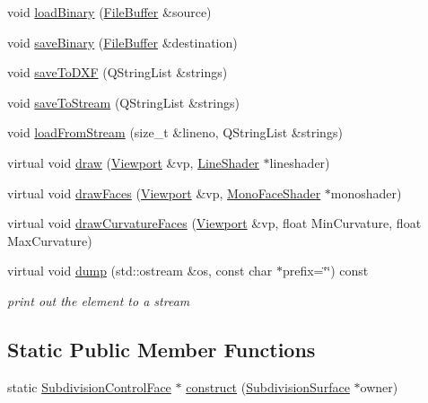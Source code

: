 \begin{DoxyCompactItemize}
\item 
void \hyperlink{classShipCAD_1_1SubdivisionControlFace_aa5ba43707787cde6e99cd645708e9200}{load\-Binary} (\hyperlink{classShipCAD_1_1FileBuffer}{File\-Buffer} \&source)
\item 
void \hyperlink{classShipCAD_1_1SubdivisionControlFace_a562b877e868dbd86ffe2c864232e1b78}{save\-Binary} (\hyperlink{classShipCAD_1_1FileBuffer}{File\-Buffer} \&destination)
\item 
void \hyperlink{classShipCAD_1_1SubdivisionControlFace_aecc7636c397ca5669cf7ddb995feac03}{save\-To\-D\-X\-F} (Q\-String\-List \&strings)
\item 
void \hyperlink{classShipCAD_1_1SubdivisionControlFace_a8a618958b27b97dd6da2473e130d7a8e}{save\-To\-Stream} (Q\-String\-List \&strings)
\item 
void \hyperlink{classShipCAD_1_1SubdivisionControlFace_ae06e29e54f93c529875bbd66b32ad3e7}{load\-From\-Stream} (size\-\_\-t \&lineno, Q\-String\-List \&strings)
\item 
virtual void \hyperlink{classShipCAD_1_1SubdivisionControlFace_ac253493bccd91108d936b651e72b46f8}{draw} (\hyperlink{classShipCAD_1_1Viewport}{Viewport} \&vp, \hyperlink{classShipCAD_1_1LineShader}{Line\-Shader} $\ast$lineshader)
\item 
virtual void \hyperlink{classShipCAD_1_1SubdivisionControlFace_aef1327fd3e623b190d67dcb461a3e950}{draw\-Faces} (\hyperlink{classShipCAD_1_1Viewport}{Viewport} \&vp, \hyperlink{classShipCAD_1_1MonoFaceShader}{Mono\-Face\-Shader} $\ast$monoshader)
\item 
virtual void \hyperlink{classShipCAD_1_1SubdivisionControlFace_aaf9226150996743d8d2ea560083ad1d8}{draw\-Curvature\-Faces} (\hyperlink{classShipCAD_1_1Viewport}{Viewport} \&vp, float Min\-Curvature, float Max\-Curvature)
\item 
virtual void \hyperlink{classShipCAD_1_1SubdivisionControlFace_a947868fba3e9bb6c587847fb9245c9ff}{dump} (std\-::ostream \&os, const char $\ast$prefix=\char`\"{}\char`\"{}) const 
\begin{DoxyCompactList}\small\item\em print out the element to a stream \end{DoxyCompactList}\end{DoxyCompactItemize}
\subsection*{Static Public Member Functions}
\begin{DoxyCompactItemize}
\item 
static \hyperlink{classShipCAD_1_1SubdivisionControlFace}{Subdivision\-Control\-Face} $\ast$ \hyperlink{classShipCAD_1_1SubdivisionControlFace_a4117f55ab3ec27bebd933f2992bc5dcd}{construct} (\hyperlink{classShipCAD_1_1SubdivisionSurface}{Subdivision\-Surface} $\ast$owner)
\end{DoxyCompactItemize}
